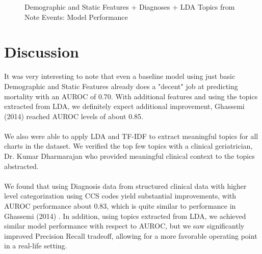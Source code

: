 \documentclass[12pt, final]{article}
\begin{document}
\begin{figure}[H]
\centering     %
{}
\caption{Demographic and Static Features + Diagnoses + LDA Topics from Note Events: Model Performance}
\label{BestModelPerformance}
\end{figure}

\section{Discussion}
\label{Discussion}
It was very interesting to note that even a baseline model using just basic Demographic and Static Features already does a "decent" job at predicting mortality with an AUROC of 0.70. With additional features and using the topics extracted from LDA, we definitely expect additional improvement, Ghassemi (2014) \cite{Ghassemi} reached AUROC levels of about 0.85.
\\
\\
We also were able to apply LDA and TF-IDF to extract meaningful topics for all charts in the dataset. We verified the top few topics with a clinical geriatrician, Dr. Kumar Dharmarajan who provided meaningful clinical context to the topics abstracted. 
\\
\\
We found that using Diagnosis data from structured clinical data with higher level categorization using CCS codes yield substantial improvements, with AUROC performance about 0.83, which is quite similar to performance in Ghassemi (2014) \cite{Ghassemi}. In addition, using topics extracted from LDA, we achieved similar model performance with respect to AUROC, but we saw significantly improved Precision Recall tradeoff, allowing for a more favorable operating point in a real-life setting.
\end{document}
